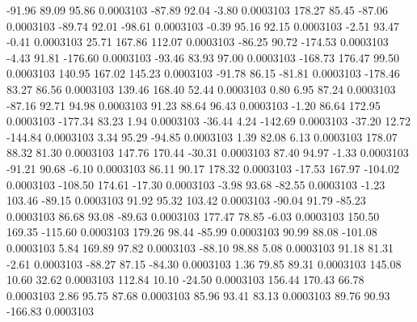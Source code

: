       -91.96       89.09       95.86     0.0003103
      -87.89       92.04       -3.80     0.0003103
      178.27       85.45      -87.06     0.0003103
      -89.74       92.01      -98.61     0.0003103
       -0.39       95.16       92.15     0.0003103
       -2.51       93.47       -0.41     0.0003103
       25.71      167.86      112.07     0.0003103
      -86.25       90.72     -174.53     0.0003103
       -4.43       91.81     -176.60     0.0003103
      -93.46       83.93       97.00     0.0003103
     -168.73      176.47       99.50     0.0003103
      140.95      167.02      145.23     0.0003103
      -91.78       86.15      -81.81     0.0003103
     -178.46       83.27       86.56     0.0003103
      139.46      168.40       52.44     0.0003103
        0.80        6.95       87.24     0.0003103
      -87.16       92.71       94.98     0.0003103
       91.23       88.64       96.43     0.0003103
       -1.20       86.64      172.95     0.0003103
     -177.34       83.23        1.94     0.0003103
      -36.44        4.24     -142.69     0.0003103
      -37.20       12.72     -144.84     0.0003103
        3.34       95.29      -94.85     0.0003103
        1.39       82.08        6.13     0.0003103
      178.07       88.32       81.30     0.0003103
      147.76      170.44      -30.31     0.0003103
       87.40       94.97       -1.33     0.0003103
      -91.21       90.68       -6.10     0.0003103
       86.11       90.17      178.32     0.0003103
      -17.53      167.97     -104.02     0.0003103
     -108.50      174.61      -17.30     0.0003103
       -3.98       93.68      -82.55     0.0003103
       -1.23      103.46      -89.15     0.0003103
       91.92       95.32      103.42     0.0003103
      -90.04       91.79      -85.23     0.0003103
       86.68       93.08      -89.63     0.0003103
      177.47       78.85       -6.03     0.0003103
      150.50      169.35     -115.60     0.0003103
      179.26       98.44      -85.99     0.0003103
       90.99       88.08     -101.08     0.0003103
        5.84      169.89       97.82     0.0003103
      -88.10       98.88        5.08     0.0003103
       91.18       81.31       -2.61     0.0003103
      -88.27       87.15      -84.30     0.0003103
        1.36       79.85       89.31     0.0003103
      145.08       10.60       32.62     0.0003103
      112.84       10.10      -24.50     0.0003103
      156.44      170.43       66.78     0.0003103
        2.86       95.75       87.68     0.0003103
       85.96       93.41       83.13     0.0003103
       89.76       90.93     -166.83     0.0003103
